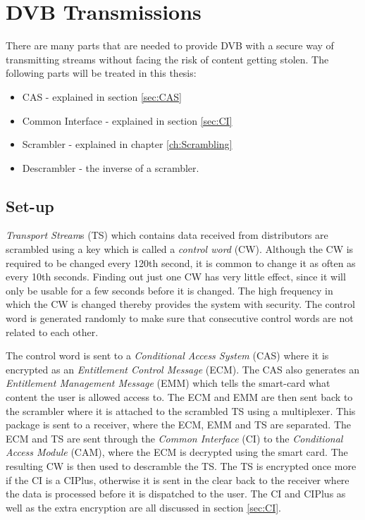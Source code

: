 \chapter{DVB Transmissions}
There are many parts that are needed to provide DVB with a secure way of 
transmitting streams without facing the risk of content getting stolen. The 
following parts will be treated in this thesis:

\begin{itemize}
\item CAS - explained in section \ref{sec:CAS}
\item Common Interface - explained in section \ref{sec:CI}
\item Scrambler - explained in chapter \ref{ch:Scrambling}
\item Descrambler - the inverse of a scrambler.
\end{itemize}

\section{Set-up} \label{sec:setup}
\emph{Transport Stream}s (TS) which contains data received from distributors are 
scrambled using a key which is called a \emph{control word} (CW). Although the CW
is required to be changed every 120th second, it is common to change it as often 
as every 10th seconds. Finding out just one CW has very little effect, since it 
will only be usable for a few seconds before it is changed. The high frequency in
which the CW is changed thereby provides the system with security. The control 
word is generated randomly to make sure that consecutive control words are not 
related to each other.

The control word is sent to a \emph{Conditional Access System} (CAS) where it is 
encrypted as an \emph{Entitlement Control Message} (ECM). The CAS also generates 
an \emph{Entitlement Management Message} (EMM) which tells the smart-card what 
content the user is allowed access to. The ECM and EMM are then sent back to the 
scrambler where it is attached to the scrambled TS using a multiplexer. This 
package is sent to a receiver, where the ECM, EMM and TS are separated. The 
ECM and TS are sent through the \emph{Common Interface} (CI) to the 
\emph{Conditional Access Module} (CAM), where the ECM is decrypted using the 
smart card. The resulting CW is then used to descramble the TS. The TS is 
encrypted once more if the CI is a CIPlus, otherwise it is sent in the clear 
back to the receiver where the data is processed before it is dispatched to the 
user. The CI and CIPlus as well as the extra encryption are all discussed in 
section \ref{sec:CI}.


